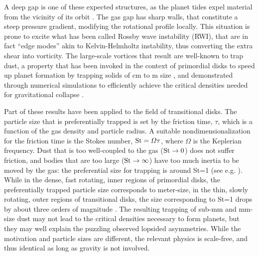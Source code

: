 \documentclass[apj]{emulateapj}
\def\blue#1{\textcolor{blue}{ #1}}
\newcommand{\St}{{\rm St}}
\begin{document}
A deep gap is one of these expected structures, as the planet tides expel material from the vicinity of its orbit 
\citep{Papaloizou-Lin84,Lin-Papaloizou86a,Lin-Papaloizou86b,Nelson00,Masset-Snellgrove01,Paardekooper-Mellema04,Quillen04,deValBorro06,Klahr-Kley06,Lyra09a,Zhu11,Kley12}. 
The gas gap has sharp walls, that constitute a steep pressure gradient, modifying the rotational profile locally. 
This situation is prone to excite what has been called Rossby wave
instability (RWI), that are in fact  ``edge modes'' 
\citep{Lovelace-Hohlfeld78,Toomre81,Papaloizou-Pringle84,Papaloizou-Pringle85,Hawley87,Lovelace99,Varniere-Tagger06,deValBorro07,Lyra08,Lyra09a,Lyra09b,
Meheut10,Meheut12a,Meheut12b,Meheut12c,Lin-Papaloizou11a,Lin-Papaloizou11b,Lin-Papaloizou12,Lyra-MacLow12,Lin12,Lin13} 
akin to Kelvin-Helmholtz instability, thus converting the extra shear
into vorticity. The large-scale vortices that result are well-known to trap 
dust, a property that has been invoked in the context of primordial disks to
speed up planet formation by trapping solids of cm to m size \citep{Barge-Sommeria95,Adams-Watkins95,Tanga96,Klahr-Henning97,Hodgson-Brandenburg98,Chavanis00,delaFuenteMarcos-Barge01,Johansen04,Inaba-Barge06}, and demonstrated through numerical simulations to efficiently achieve the
critical densities needed for gravitational collapse
\citep{Lyra08,Lyra09a,Lyra09b}. 

Part of these results have been applied to the field of
transitional disks. The particle size that is
preferentially trapped is set by the friction time, $\tau$, which is a
function of the gas density and particle radius. A suitable nondimensionalization for the
friction time is the Stokes number, $\St = \varOmega \tau$,
where $\varOmega$ is the Keplerian frequency. Dust that is too
well-coupled to the gas ($\St\rightarrow 0$) does not suffer friction, and bodies
that are too large ($\St\rightarrow \infty$) have too much inertia to be moved by the
gas: the preferential size for trapping is around \St=1 (see e.g. \citealt{Youdin-Goodman05,Youdin08}).
While in the dense, fast rotating, inner regions of primordial disks,
the preferentially trapped particle size corresponds to meter-size, in
the thin, slowly rotating, outer regions of transitional
disks, the size corresponding to \St=1 drops by about three orders of
magnitude \blue{\citep{Brauer07,Pinilla12a}}. The resulting trapping of sub-mm and mm-size dust may not
lead to the critical densities necessary to form planets, but they may
well explain the puzzling observed lopsided asymmetries. While the 
motivation and particle sizes are different, the relevant physics 
is scale-free, and thus identical as long as gravity is not involved. 
\end{document}
